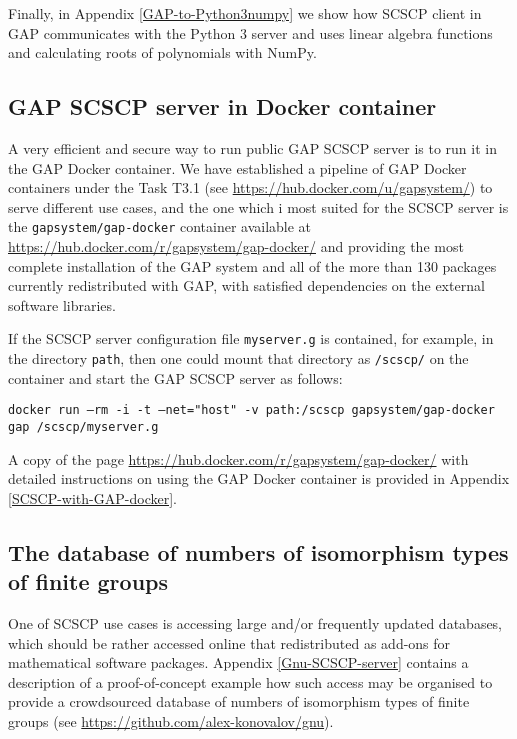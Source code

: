 \documentclass{deliverablereport}
\begin{document}
Finally, in Appendix \ref{GAP-to-Python3numpy} we show how
SCSCP client in GAP communicates with the Python 3 server
and uses linear algebra functions and calculating roots
of polynomials with NumPy.

\subsection{GAP SCSCP server in Docker container}\label{gap-docker}

A very efficient and secure way to run public GAP SCSCP
server is to run it in the GAP Docker container. 
We have established a pipeline of GAP Docker containers
under the Task T3.1 (see \url{https://hub.docker.com/u/gapsystem/})
to serve different use cases, and the one which i most
suited for the SCSCP server is the {\tt gapsystem/gap-docker} 
container available at \url{https://hub.docker.com/r/gapsystem/gap-docker/} and
providing the most complete installation
of the GAP system and all of the more than 130 packages
currently redistributed with GAP, with satisfied dependencies
on the external software libraries.

If the SCSCP server configuration file {\tt myserver.g} is 
contained, for example, in the directory {\tt path}, 
then one could mount that directory as {\tt /scscp/} on the
container and start the GAP SCSCP server as follows:

{\tiny{\tt docker run --rm -i -t --net="host" -v path:/scscp gapsystem/gap-docker gap /scscp/myserver.g}}

A copy of the page \url{https://hub.docker.com/r/gapsystem/gap-docker/}
with detailed instructions on using the GAP Docker container 
is provided in Appendix \ref{SCSCP-with-GAP-docker}.


\subsection{The database of numbers of isomorphism
types of finite groups}\label{gnu-reproducibility}

One of SCSCP use cases is accessing large and/or frequently updated
databases, which should be rather accessed online that redistributed as
add-ons for mathematical software packages. Appendix \ref{Gnu-SCSCP-server}
contains a description of a proof-of-concept example how such access may
be organised to provide a crowdsourced database of numbers of isomorphism
types of finite groups (see  \url{https://github.com/alex-konovalov/gnu}). 
\end{document}
